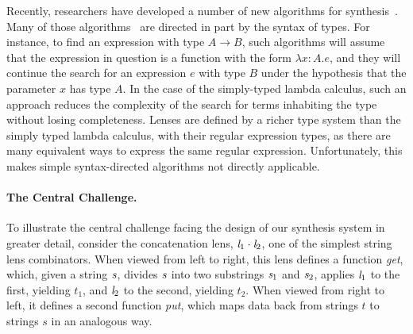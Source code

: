 \documentclass[numbers]{sigplanconf}
\begin{document}
Recently, researchers have developed a number of new algorithms for
synthesis~\cite{yag+:pldi16,?,?}.  Many of those
algorithms~\cite{osera+:pldi15,frankle+:popl16,armando+:pldi16} are
directed in part by the syntax of types.  For instance, to find an
expression with type $A \rightarrow B$, such algorithms will assume
that the expression in question is a function with the form $\lambda
x{:}A. e$, and they will continue the search for an expression $e$
with type $B$ under the hypothesis that the parameter $x$ has type
$A$.  In the case of the simply-typed lambda calculus, such an
approach reduces the complexity of the search for terms inhabiting the
type without losing completeness.  Lenses are defined by a richer type system
than the simply typed lambda calculus,
with their regular expression types, as
there are many equivalent ways to express the same regular expression.
Unfortunately, this makes simple
syntax-directed algorithms not directly applicable.

\paragraph*{The Central Challenge.}
To illustrate the central challenge facing the design of our synthesis system
in greater detail,
consider the concatenation lens, $\mathit{l}_1 \cdot \mathit{l}_2$,
one of the simplest string lens combinators.  
When viewed from left to right, this lens defines a function \emph{get}, which,
given a string 
$\mathit{s}$, divides $\mathit{s}$ into two substrings $\mathit{s}_1$ 
and $\mathit{s}_2$, applies $\mathit{l}_1$ to the first, yielding $t_1$,
and $\mathit{l}_2$ to the second, yielding $t_2$.  When viewed from
right to left, it defines a second function \emph{put}, which maps
data back from strings $t$ to strings $s$ in an analogous way.
\end{document}
